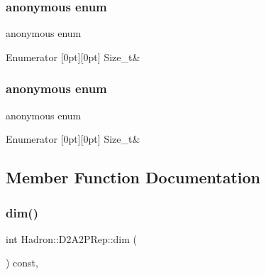 \subsubsection{\texorpdfstring{anonymous enum}{anonymous enum}}
{\footnotesize\ttfamily anonymous enum}

\begin{DoxyEnumFields}{Enumerator}
[0pt][0pt]{}\mbox{\label{structHadron_1_1D2A2PRep_a1212c6b14867a9f90d76e84e723e95d1a8730aa24b970ac4f1ea8deea429de0e7}} 
Size\+\_\+t&\\
\hline

\end{DoxyEnumFields}
\mbox{\label{structHadron_1_1D2A2PRep_a1212c6b14867a9f90d76e84e723e95d1}} 
\subsubsection{\texorpdfstring{anonymous enum}{anonymous enum}}
{\footnotesize\ttfamily anonymous enum}

\begin{DoxyEnumFields}{Enumerator}
[0pt][0pt]{}\mbox{\label{structHadron_1_1D2A2PRep_a1212c6b14867a9f90d76e84e723e95d1a8730aa24b970ac4f1ea8deea429de0e7}} 
Size\+\_\+t&\\
\hline

\end{DoxyEnumFields}


\subsection{Member Function Documentation}
\mbox{\label{structHadron_1_1D2A2PRep_a1b4aaa7427dc7ee8255807a8cfa19e61}} 
\subsubsection{\texorpdfstring{dim()}{dim()}\hspace{0.1cm}{\footnotesize\ttfamily [1/2]}}
{\footnotesize\ttfamily int Hadron\+::\+D2\+A2\+P\+Rep\+::dim (\begin{DoxyParamCaption}{ }\end{DoxyParamCaption}) const\hspace{0.3cm}{\ttfamily [inline]}, {\ttfamily [virtual]}}


